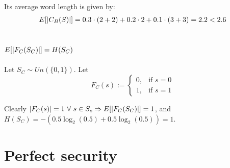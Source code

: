 \documentclass[a4paper]{scrreprt}
\DeclarePairedDelimiter\abs{\lvert}{\rvert}
\begin{document}
Its average word length is given by:
\begin{align*}
	E[\abs{C_B(S)}] = 0.3 \cdot (2 + 2) + 0.2 \cdot 2 + 0.1 \cdot (3 + 3) = 2.2 < 2.6
\end{align*}

\subsection{$E[\abs{F_C(S_C)}] = H(S_C)$}

Let $S_C \sim Un(\{0, 1\})$. Let
\[
	F_C(s) :=
	\begin{cases}
		0, & \text{if } s = 0 \\
		1, & \text{if } s = 1
	\end{cases}
\]

Clearly $\abs{F_C(s)} = 1\ \forall\ s \in S_c \Rightarrow E[\abs{F_C(S_C)}] =
1$, and $H(S_C) = -(0.5 \log_2(0.5) + 0.5 \log_2(0.5)) = 1$.


\section{Perfect security}
\end{document}
